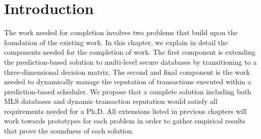 \section{Introduction}
\label{diss:introduction}

The work needed for completion involves two problems that build upon the foundation of the existing work. In this chapter, we explain in detail the components needed for the completion of work. The first component is extending the prediction-based solution to multi-level secure databases by transitioning to a three-dimensional decision matrix. The second and final component is the work needed to dynamically manage the reputation of transactions executed within a prediction-based scheduler. We propose that a complete solution including both MLS databases and dynamic transaction reputation would satisfy all requirements needed for a Ph.D. All extensions listed in previous chapters will work towards prototypes for each problem in order to gather empirical results that prove the soundness of each solution.
